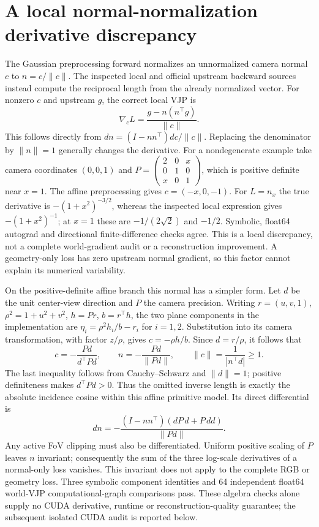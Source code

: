 \documentclass[11pt,a4paper]{article}
\begin{document}
\section{A local normal-normalization derivative discrepancy}
The Gaussian preprocessing forward normalizes an unnormalized camera
normal $c$ to $n=c/\|c\|$. The inspected local and official upstream
backward sources~\cite{gggscode} instead compute the reciprocal length
from the already normalized vector. For nonzero $c$ and upstream $g$,
the correct local VJP is
\[
 \nabla_c L=\frac{g-n(n^\top g)}{\|c\|}.
\]
This follows directly from $dn=(I-nn^\top)dc/\|c\|$.
Replacing the denominator by $\|n\|=1$ generally changes the derivative.
For a nondegenerate example take camera coordinates $(0,0,1)$ and
$P=\left(\begin{smallmatrix}2&0&x\\0&1&0\\x&0&1\end{smallmatrix}\right)$,
which is positive definite near $x=1$. The affine preprocessing gives
$c=(-x,0,-1)$. For $L=n_x$ the true derivative is
$-(1+x^2)^{-3/2}$, whereas the inspected local expression gives
$-(1+x^2)^{-1}$; at $x=1$ these are $-1/(2\sqrt2)$ and $-1/2$.
Symbolic, float64 autograd and directional finite-difference checks agree.
This is a local discrepancy, not a complete world-gradient audit or
a reconstruction improvement. A geometry-only loss has zero upstream
normal gradient, so this factor cannot explain its numerical variability.

On the positive-definite affine branch this normal has a simpler form.
Let $d$ be the unit center-view direction and $P$ the camera precision.
Writing $r=(u,v,1)$, $\rho^2=1+u^2+v^2$, $h=Pr$, $b=r^\top h$,
the two plane components in the implementation are
$\eta_i=\rho^2h_i/b-r_i$ for $i=1,2$.
Substitution into its camera transformation, with factor $z/\rho$,
gives $c=-\rho h/b$. Since $d=r/\rho$, it follows that
\[
 c=-\frac{Pd}{d^\top Pd},\qquad
 n=-\frac{Pd}{\|Pd\|},\qquad
 \|c\|=\frac{1}{|n^\top d|}\ge1.
\]
The last inequality follows from Cauchy--Schwarz and $\|d\|=1$;
positive definiteness makes $d^\top Pd>0$.
Thus the omitted inverse length is exactly the absolute incidence
cosine within this affine primitive model. Its direct differential is
\[
 dn=-\frac{(I-nn^\top)(dP\,d+P\,dd)}{\|Pd\|}.
\]
Any active FoV clipping must also be differentiated.
Uniform positive scaling of $P$ leaves $n$ invariant; consequently
the sum of the three log-scale derivatives of a normal-only loss
vanishes. This invariant does not apply to the complete RGB or
geometry loss. Three symbolic component identities and 64 independent
float64 world-VJP computational-graph comparisons pass. These algebra
checks alone supply no CUDA derivative, runtime or reconstruction-quality
guarantee; the subsequent isolated CUDA audit is reported below.
\end{document}
